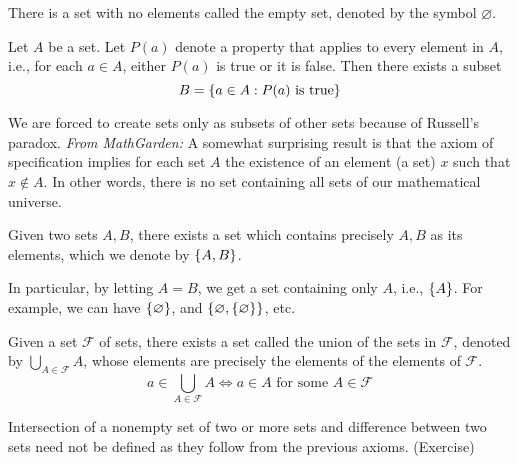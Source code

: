 \begin{axiom} \label{zfc:existence}
    There is a set with no elements called the empty set, denoted by the symbol $\varnothing$.
\end{axiom}

\begin{axiom} \label{zfc:specification}
    Let $A$ be a set. Let $P(a)$ denote a property that applies to every element in $A$, i.e., for each $a \in A$, either $P(a)$ is true or it is false. Then there exists a subset
    \[
        B = \set{a \in A: P(a) \text{ is true}}
    \]
\end{axiom}
\begin{rem}
    We are forced to create sets only as subsets of other sets because of Russell's paradox. \textcolor{red!85!black}{\emph{From MathGarden:} A somewhat surprising result is that the axiom of specification implies for each set $A$ the existence of an element (a set) $x$ such that $x \not\in A$. In other words, there is no set containing all sets of our mathematical universe.}
\end{rem}

\begin{axiom}\label{zfc:pairing}
    Given two sets $A, B$, there exists a set which contains precisely $A, B$ as its elements, which we denote by $\set{A, B}$.
\end{axiom}
\begin{rem}
    In particular, by letting $A = B$, we get a set containing only $A$, i.e., $\set{A}$. For example, we can have $\set{\varnothing}$, and $\set{\varnothing, \set{\varnothing}}$, etc.
\end{rem}

\begin{axiom} \label{zfc:unions}
    Given a set $\mathscr{F}$ of sets, there exists a set called the union of the sets in $\mathscr{F}$, denoted by $\bigcup_{A \in \mathscr{F}} A$, whose elements are precisely the elements of the elements of $\mathscr{F}$.
    \[
        a \in \bigcup_{A \in \mathscr{F}} A \iff a \in A \text{ for some } A \in \mathscr{F}
    \]
\end{axiom}

\begin{rem}
    Intersection of a nonempty set of two or more sets and difference between two sets need not be defined as they follow from the previous axioms. (Exercise)
\end{rem}

